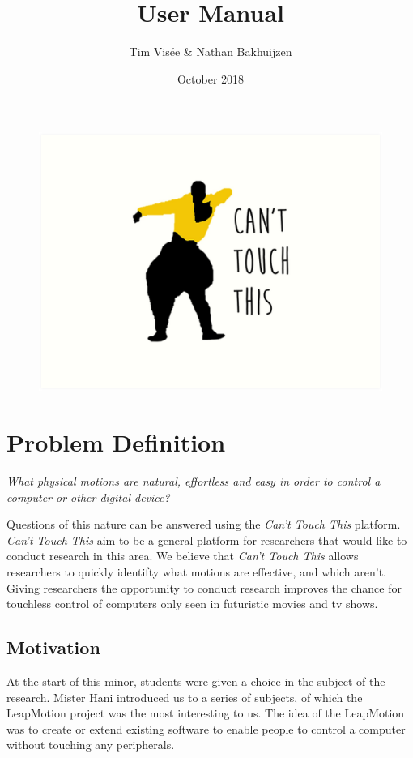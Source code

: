 \documentclass[a4paper]{article}
\title{User Manual}
\author{Tim Visée \& Nathan Bakhuijzen}
\date{October 2018}
\begin{document}
  \maketitle
  \begin{figure}[h]
    \centering
    \includegraphics[width=\linewidth]{cant-touch-this}
  \end{figure}
  \clearpage

  \section{Problem Definition}
  \textit{What physical motions are natural, effortless and easy in order to
    control a computer or other digital device?}

  Questions of this nature can be answered using the \textit{Can't Touch This}
  platform. \textit{Can't Touch This} aim to be a general platform for
  researchers that would like to conduct research in this area. We believe that
  \textit{Can't Touch This} allows researchers to quickly identifty what motions
  are effective, and which aren't. Giving researchers the opportunity to conduct
  research improves the chance for touchless control of computers only seen
  in futuristic movies and tv shows.

  \subsection{Motivation}
  At the start of this minor, students were given a choice in the subject of the
  research. Mister Hani introduced us to a series of subjects, of which the
  LeapMotion project was the most interesting to us. The idea of the LeapMotion
  was to create or extend existing software to enable people to control a
  computer without touching any peripherals.
\end{document}

